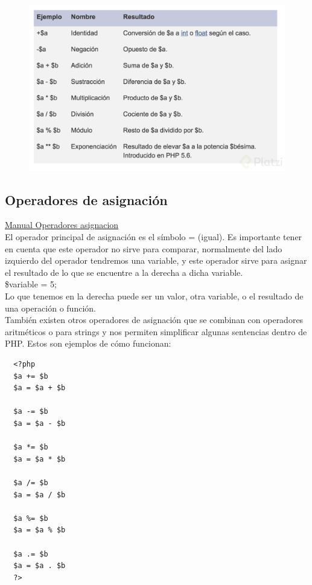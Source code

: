 \documentclass{article}
\begin{document}
\begin{figure}[h!]
  \centering
  \includegraphics[scale=0.3]{./Pictures/022_operadores.jpg}
\end{figure}


\subsection*{Operadores de asignación}%
\href{http://php.net/manual/es/language.operators.assignment.php}{Manual Operadores asignacion}\\
El operador principal de asignación es el símbolo = (igual). Es importante
tener en cuenta que este operador no sirve para comparar, normalmente del lado
izquierdo del operador tendremos una variable, y este operador sirve para
asignar el resultado de lo que se encuentre a la derecha a dicha variable.\\

\$variable = 5;\\

Lo que tenemos en la derecha puede ser un valor, otra variable, o el resultado
de una operación o función.\\

También existen otros operadores de asignación que se combinan con operadores
aritméticos o para strings y nos permiten simplificar algunas sentencias dentro
de PHP. Estos son ejemplos de cómo funcionan:\\

\begin{verbatim}
  <?php
  $a += $b
  $a = $a + $b

  $a -= $b
  $a = $a - $b

  $a *= $b
  $a = $a * $b

  $a /= $b
  $a = $a / $b

  $a %= $b
  $a = $a % $b

  $a .= $b
  $a = $a . $b
  ?>
\end{verbatim}
\end{document}
